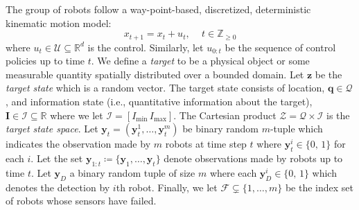 \documentclass[letterpaper, 10 pt, conference]{ieeeconf}
\newcommand{\Ram}[1]{{\normalsize{\textbf{({\color{green}Ram:\ }#1)}}}}
\begin{document}
The group of robots follow a way-point-based, discretized, deterministic kinematic
motion model:
%
%
\begin{equation}
x_{t+1} = x_t + u_t, \,\,\,\,\,\,\, t \in \mathbb{Z}_{\geq 0}
\label{eq:constraint}
\end{equation}
where $u_t \in \mathcal{U} \subseteq \mathbb{R}^d$ is the control.
Similarly, let $u_{0:t}$ be the sequence of control policies up to time $t$.
We define a \emph{target} to be a physical object or some measurable quantity spatially distributed over a bounded domain.
Let $\bm{z}$ be the \emph{target state} which is a random vector. 
The target state consists of location, $\bm{q} \in \mathcal{Q}$, and information state (i.e., quantitative information about the target), $\bm{I} \in \mathcal{I} \subseteq \mathbb{R}$ where we let $\mathcal{I} =[I_{\min}\,I_{\max}]$.
The Cartesian product $\mathcal{Z} = \mathcal{Q} \times \mathcal{I}$ is the \emph{target state space}.
Let $\bm{y}_{t}=(\bm{y}_{t}^{1},\dots,\bm{y}_{t}^{m})$ be binary random $m$-tuple which indicates the observation made by $m$ robots at time step $t$ where $\bm{y}_{t}^{i} \in \lbrace 0,\,1 \rbrace$ for each $i$.
Let the set $\bm{y}_{1:t}\coloneqq \lbrace \bm{y}_1,\dots,\bm{y}_t \rbrace$ denote observations made by robots up to time $t$. Let $\bm{y}_{D}$ a binary random tuple of size $m$ where each $\bm{y}_{D}^i \in \lbrace 0,\,1 \rbrace$ which denotes the detection by $i$th robot.
Finally, we let $\mathcal{F} \subsetneq \lbrace 1,\dots,m \rbrace$ be the index set of robots whose sensors have failed.
\end{document}
